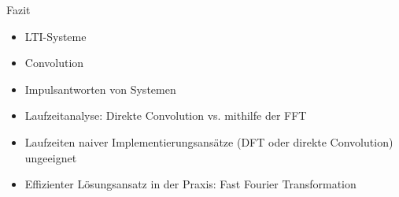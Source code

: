 \begin{frame}[allowframebreaks]{Fazit}
    \begin{itemize}
        \item LTI-Systeme
        \item Convolution
        \item Impulsantworten von Systemen
        \item Laufzeitanalyse: Direkte Convolution vs. mithilfe der FFT
        \item Laufzeiten naiver Implementierungsansätze (DFT oder direkte Convolution) ungeeignet
        \item Effizienter Lösungsansatz in der Praxis: Fast Fourier Transformation
    \end{itemize}
\end{frame}